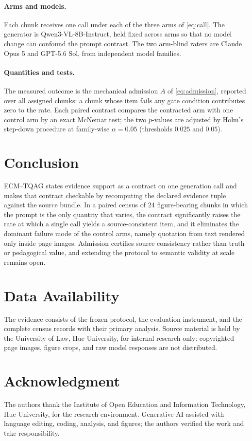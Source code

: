 \documentclass[conference]{IEEEtran}
\begin{document}
\paragraph{Arms and models.}
Each chunk receives one call under each of the three arms of
\eqref{eq:call}. The generator is Qwen3-VL-8B-Instruct, held fixed
across arms so that no model change can confound the prompt contrast.
The two arm-blind raters are Claude Opus 5 and GPT-5.6 Sol, from
independent model families.

\paragraph{Quantities and tests.}
The measured outcome is the mechanical admission $A$ of
\eqref{eq:admission}, reported over all assigned chunks: a chunk whose
item fails any gate condition contributes zero to the rate. Each paired contrast compares the contracted arm with one control arm
by an exact McNemar test; the two $p$-values are adjusted by Holm's
step-down procedure at family-wise $\alpha=0.05$ (thresholds $0.025$
and $0.05$).




\section{Conclusion}
ECM--TQAG states evidence support as a contract on one generation call
and makes that contract checkable by recomputing the declared evidence
tuple against the source bundle. In a paired census of 24
figure-bearing chunks in which the prompt is the only quantity that
varies, the contract significantly raises the rate at which a single
call yields a source-consistent item, and it eliminates the dominant
failure mode of the control arms, namely quotation from text rendered
only inside page images. Admission certifies source consistency rather
than truth or pedagogical value, and extending the protocol to semantic
validity at scale remains open.

\section*{Data Availability}
The evidence consists of the frozen protocol, the evaluation instrument,
and the complete census records with their primary analysis. Source
material is held by the University of Law, Hue University, for internal
research only: copyrighted page images, figure crops, and raw model
responses are not distributed.

\section*{Acknowledgment}
The authors thank the Institute of Open Education and Information
Technology, Hue University, for the research environment. Generative AI
assisted with language editing, coding, analysis, and figures; the
authors verified the work and take responsibility.

\balance
{\footnotesize}
\end{document}
